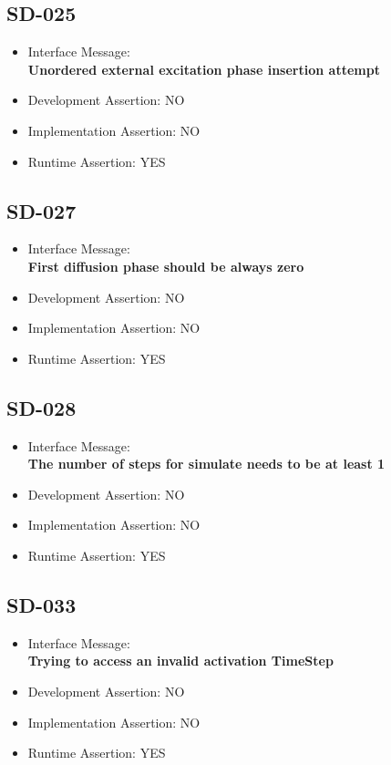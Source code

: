 \subsection{SD-025}
\begin{itemize}
  \item Interface Message:\\[1em]\textbf{Unordered external excitation phase insertion attempt}
  \item Development Assertion: NO
  \item Implementation Assertion: NO
  \item Runtime Assertion: YES
\end{itemize}

\subsection{SD-027}
\begin{itemize}
  \item Interface Message:\\[1em]\textbf{First diffusion phase should be always zero}
  \item Development Assertion: NO
  \item Implementation Assertion: NO
  \item Runtime Assertion: YES
\end{itemize}

\subsection{SD-028}
\begin{itemize}
  \item Interface Message:\\[1em]\textbf{The number of steps for simulate needs to be at least 1}
  \item Development Assertion: NO
  \item Implementation Assertion: NO
  \item Runtime Assertion: YES
\end{itemize}

\subsection{SD-033}
\begin{itemize}
  \item Interface Message:\\[1em]\textbf{Trying to access an invalid activation TimeStep}
  \item Development Assertion: NO
  \item Implementation Assertion: NO
  \item Runtime Assertion: YES
\end{itemize}

